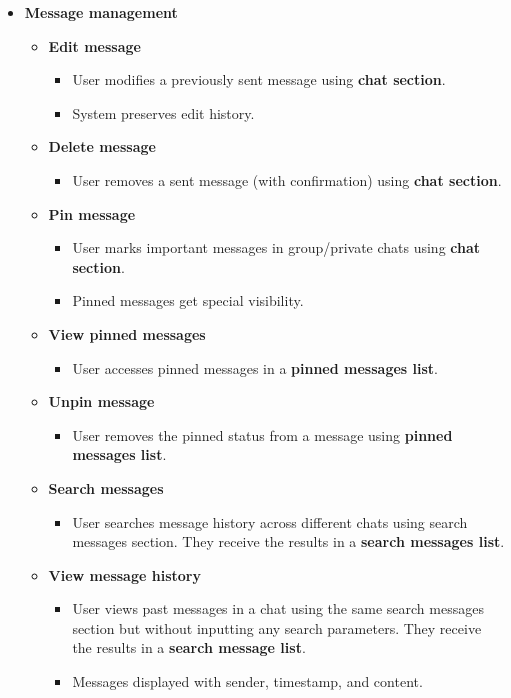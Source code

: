 \documentclass[]{VUMIFTemplateClass}
\begin{document}
\begin{itemize}
    \item \textbf{Message management}
    \begin{itemize}
        \item \textbf{Edit message}
        \begin{itemize}
            \item User modifies a previously sent message using \textbf{chat section}.
            \item System preserves edit history.
        \end{itemize}
        \item \textbf{Delete message}
        \begin{itemize}
            \item User removes a sent message (with confirmation) using \textbf{chat section}.
        \end{itemize}
        \item \textbf{Pin message}
        \begin{itemize}
            \item User marks important messages in group/private chats using \textbf{chat section}.
            \item Pinned messages get special visibility.
        \end{itemize}
        \item \textbf{View pinned messages}
        \begin{itemize}
            \item User accesses pinned messages in a \textbf{pinned messages list}.
        \end{itemize}
        \item \textbf{Unpin message}
        \begin{itemize}
            \item User removes the pinned status from a message using \textbf{pinned messages list}.
        \end{itemize}
        \item \textbf{Search messages}
        \begin{itemize}
            \item User searches message history across different chats using search messages section. They receive the results in a \textbf{search messages list}.
        \end{itemize}
        \item \textbf{View message history}
        \begin{itemize}
            \item User views past messages in a chat using the same search messages section but without inputting any search parameters. They receive the results in a \textbf{search message list}.
            \item Messages displayed with sender, timestamp, and content.
        \end{itemize}
    \end{itemize}


\end{itemize}
\end{document}
